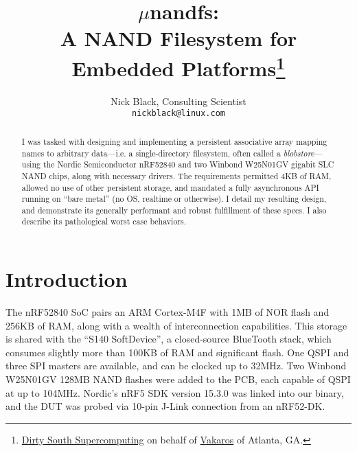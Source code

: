 \documentclass[letterpaper,10pt]{article}
\title{$\mu$nandfs:\\
A NAND Filesystem for Embedded Platforms\thanks{
 \href{https://www.dsscaw.com/}{Dirty South Supercomputing} on behalf
 of \href{https://www.vakaros.com/}{Vakaros} of Atlanta, GA.
}\\
}
\author{Nick Black, Consulting Scientist\\
\texttt{nickblack@linux.com}
}
\begin{document}
\maketitle
\thispagestyle{fancy}
\date{}
\begin{abstract}
\setlength{\parindent}{0pt}
I was tasked with designing and implementing a persistent associative array
mapping names to arbitrary data---i.e. a single-directory filesystem, often called a
\textit{blobstore}---using the Nordic Semiconductor nRF52840 and two Winbond
W25N01GV gigabit SLC NAND chips, along with necessary drivers. The requirements permitted 4KB of RAM,
allowed no use of other persistent storage, and mandated a fully asynchronous
API running on ``bare metal'' (no OS, realtime or otherwise). I detail my
resulting design, and demonstrate its generally performant and robust
fulfillment of these specs. I also describe its pathological worst case
behaviors.
\end{abstract}
\section{Introduction}
The nRF52840\parencite{nrf52840} SoC pairs an ARM Cortex-M4F with 1MB of
NOR flash and 256KB of RAM, along with a wealth of interconnection
capabilities. This storage is shared with the ``S140
SoftDevice''\parencite{s140}, a closed-source BlueTooth stack, which consumes
slightly more than 100KB of RAM and significant flash. One QSPI and three SPI
masters are available, and can be clocked up to 32MHz. Two Winbond W25N01GV\parencite{winbond}
128MB NAND flashes were added to the PCB, each capable of QSPI at up to 104MHz.
Nordic's nRF5 SDK\parencite{nrf52sdk} version 15.3.0 was linked into our binary,
and the DUT was probed via 10-pin J-Link\parencite{segger} connection from
an nRF52-DK\parencite{nrf52dk}.

\printbibliography
\end{document}
